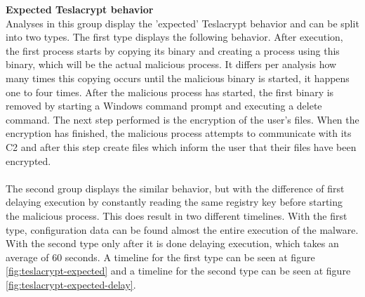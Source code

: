 \documentclass[conference]{IEEEtran}
\begin{document}
\textbf{Expected Teslacrypt behavior}\\
Analyses in this group display the 'expected' Teslacrypt behavior \cite{wyke-currans} and can be split into two types. The first type displays the following behavior. After execution, the first process starts by copying its binary and creating a process using this binary, which will be the actual malicious process. It differs per analysis how many times this copying occurs until the malicious binary is started, it happens one to four times. After the malicious process has started, the first binary is removed by starting a Windows command prompt and executing a delete command. The next step performed is the encryption of the user's files. When the encryption has finished, the malicious process attempts to communicate with its \Gls{C2} and after this step create files which inform the user that their files have been encrypted.\\
\\The second group displays the similar behavior, but with the difference of first delaying execution by constantly reading the same registry key before starting the malicious process. This does result in two different timelines. With the first type, \Gls{configuration data} can be found almost the entire execution of the malware. With the second type only after it is done delaying execution, which takes an average of 60 seconds. A timeline for the first type can be seen at figure \ref{fig:teslacrypt-expected} and a timeline for the second type can be seen at figure \ref{fig:teslacrypt-expected-delay}.
\end{document}
